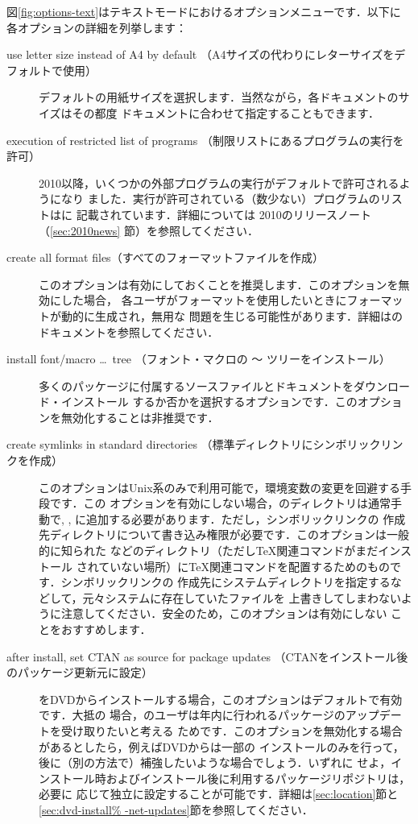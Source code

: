 \documentclass[uplatex,dvipdfmx,tombow]{jsarticle}
\begin{document}
図\ref{fig:options-text}はテキストモードにおけるオプションメニューです．以下に
各オプションの詳細を列挙します：
%
\begin{description}
\item[use letter size instead of A4 by default%
（A4サイズの代わりにレターサイズをデフォルトで使用）]
デフォルトの用紙サイズを選択します．当然ながら，各ドキュメントのサイズはその都度
ドキュメントに合わせて指定することもできます．

\item[execution of restricted list of programs%
（制限リストにあるプログラムの実行を許可）]
\TL{} 2010以降，いくつかの外部プログラムの実行がデフォルトで許可されるようになり
ました．実行が許可されている（数少ない）プログラムのリストはに
記載されています．詳細については\TL{} 2010のリリースノート（\ref{sec:2010news}%
節）を参照してください．

\item[create all format files（すべてのフォーマットファイルを作成）]
このオプションは有効にしておくことを推奨します．このオプションを無効にした場合，
各ユーザがフォーマットを使用したいときにフォーマットが動的に生成され，無用な
問題を生じる可能性があります．詳細はのドキュメントを参照してください．

\item[install font/macro \dots\ tree%
（フォント・マクロの 〜 ツリーをインストール）]
多くのパッケージに付属するソースファイルとドキュメントをダウンロード・インストール
するか否かを選択するオプションです．このオプションを無効化することは非推奨です．

\item[create symlinks in standard directories%
（標準ディレクトリにシンボリックリンクを作成）]
このオプションはUnix系のみで利用可能で，環境変数の変更を回避する手段です．この
オプションを有効にしない場合，\TL のディレクトリは通常手動で, , に追加する必要があります．ただし，シンボリックリンクの
作成先ディレクトリについて書き込み権限が必要です．このオプションは一般的に知られた
などのディレクトリ（ただし\TeX 関連コマンドがまだインストール
されていない場所）に\TeX 関連コマンドを配置するためのものです．シンボリックリンクの
作成先にシステムディレクトリを指定するなどして，元々システムに存在していたファイルを
上書きしてしまわないように注意してください．安全のため，このオプションは有効にしない
ことをおすすめします．

\item[after install, set CTAN as source for package updates%
（CTANをインストール後のパッケージ更新元に設定）]
\TL をDVDからインストールする場合，このオプションはデフォルトで有効です．大抵の
場合，\TL のユーザは年内に行われるパッケージのアップデートを受け取りたいと考える
ためです．このオプションを無効化する場合があるとしたら，例えばDVDからは一部の
インストールのみを行って，後に（別の方法で）補強したいような場合でしょう．いずれに
せよ，インストール時およびインストール後に利用するパッケージリポジトリは，必要に
応じて独立に設定することが可能です．詳細は\ref{sec:location}節と\ref{sec:dvd-install%
-net-updates}節を参照してください．
\end{description}
\end{document}
